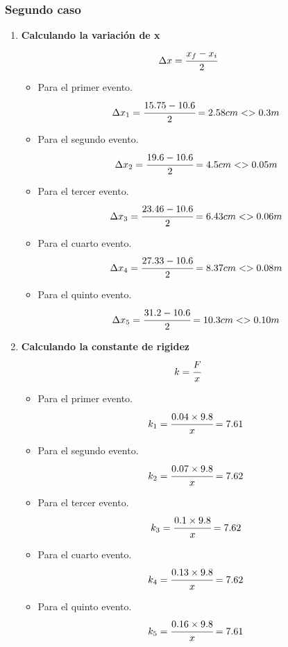 \subsubsection{Segundo caso}
\begin{enumerate}[label=\bfseries\alph*.-,itemsep=2pt]
	\item \textbf{Calculando la variación de x}
	      \[\Delta x= \cfrac{x_f-x_i}{2}\]
	      \begin{itemize}[label=\textbf{$\bullet$},itemsep=2pt,partopsep=6pt,parsep=6pt]
		      \item Para el primer evento.
		            \[\Delta x_1= \cfrac{15.75-10.6}{2}=2.58cm<>0.3m\]
		      \item Para el segundo evento.
		            \[\Delta x_2= \cfrac{19.6-10.6}{2}=4.5cm<>0.05m\]
		      \item Para el tercer evento.
		            \[\Delta x_3= \cfrac{23.46-10.6}{2}=6.43cm<>0.06m\]
		      \item Para el cuarto evento.
		            \[\Delta x_4= \cfrac{27.33-10.6}{2}=8.37cm<>0.08m\]
		      \item Para el quinto evento.
		            \[\Delta x_5= \cfrac{31.2-10.6}{2}=10.3cm<>0.10m\]
	      \end{itemize}

	\item \textbf{Calculando la constante de rigidez}
	      \[k= \cfrac{F}{x}\]

	      \begin{itemize}[label=\textbf{$\bullet$},itemsep=2pt,partopsep=6pt,parsep=6pt]
		      \item Para el primer evento.
		            \[k_1= \cfrac{0.04\times{9.8}}{x}=7.61\]
		      \item Para el segundo evento.
		            \[k_2= \cfrac{0.07\times{9.8}}{x}=7.62\]
		      \item Para el tercer evento.
		            \[k_3= \cfrac{0.1\times{9.8}}{x}=7.62\]
		      \item Para el cuarto evento.
		            \[k_4= \cfrac{0.13\times{9.8}}{x}=7.62\]
		      \item Para el quinto evento.
		            \[k_5= \cfrac{0.16\times{9.8}}{x}=7.61\]
	      \end{itemize}
\end{enumerate}

